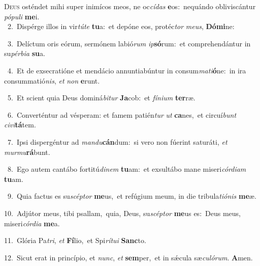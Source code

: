 \lettrine{\initial\textcolor{\initialcolor}{D}}{eus} osténdet mihi super inimícos meos, ne oc\-\textit{cí}\-\textit{das} \textbf{e}\-os:~\star nequándo obliviscántur \textit{pó}\-\textit{pu}\textit{li} \textbf{me}\-i.\\
{\numbfont\textcolor{\numbcolor}{~2.}}~Dispérge illos in vir\-\textit{tú}\-\textit{te} \textbf{tu}\-a:~\star et depóne eos, protéc\textit{tor} \textit{me}\-\textit{us}, \textbf{Dó}\-\textbf{mi}ne:\par
{\numbfont\textcolor{\numbcolor}{~3.}}~Delíctum oris eórum, sermónem labió\textit{rum} \textit{ip}\-\textbf{só}rum:~\star et comprehendántur in su\-\textit{pér}\-\textit{bi}\textit{a} \textbf{su}\-a.\par
{\numbfont\textcolor{\numbcolor}{~4.}}~Et de exsecratióne et mendácio annuntiabúntur in consum\-\textit{ma}\-\textit{ti}\textbf{ó}ne:~\star in ira consummatió\-\textit{nis}\-, \textit{et} \textit{non} \textbf{e}\-runt.\par
{\numbfont\textcolor{\numbcolor}{~5.}}~Et scient quia Deus dominá\-\textit{bi}\-\textit{tur} \textbf{Ja}\-cob:~\star et \textit{fí}\-\textit{ni}\textit{um} \textbf{ter}\-ræ.\par
{\numbfont\textcolor{\numbcolor}{~6.}}~Converténtur ad vésperam: et famem patién\textit{tur} \textit{ut} \textbf{ca}\-nes,~\star et circuí\textit{bunt} \textit{ci}\-\textit{vi}\textbf{tá}tem.\par
{\numbfont\textcolor{\numbcolor}{~7.}}~Ipsi dispergéntur ad \textit{man}\-\textit{du}\textbf{cán}dum:~\star si vero non fúerint saturáti, \textit{et} \textit{mur}\-\textit{mu}\textbf{rá}bunt.\par
{\numbfont\textcolor{\numbcolor}{~8.}}~Ego autem cantábo fortitú\-\textit{di}\-\textit{nem} \textbf{tu}\-am:~\star et exsultábo mane miseri\-\textit{cór}\-\textit{di}\textit{am} \textbf{tu}\-am.\par
{\numbfont\textcolor{\numbcolor}{~9.}}~Quia factus es su\-\textit{scép}\-\textit{tor} \textbf{me}\-us,~\star et refúgium meum, in die tribula\-\textit{ti}\-\textit{ó}\textit{nis} \textbf{me}\-æ.\par
{\numbfont\textcolor{\numbcolor}{10.}}~Adjútor meus, tibi psallam,~\dagger quia, Deus, su\-\textit{scép}\-\textit{tor} \textbf{me}\-us es:~\star Deus meus, miseri\-\textit{cór}\-\textit{di}\textit{a} \textbf{me}\-a.\par
{\numbfont\textcolor{\numbcolor}{11.}}~Glória Pa\-\textit{tri}\-, \textit{et} \textbf{Fí}\-lio,~\star et Spi\-\textit{rí}\-\textit{tu}\textit{i} \textbf{Sanc}\-to.\par
{\numbfont\textcolor{\numbcolor}{12.}}~Sicut erat in princípio, et \textit{nunc}\-, \textit{et} \textbf{sem}\-per,~\star et in sǽcula sæ\-\textit{cu}\-\textit{ló}\textit{rum}. \textbf{A}\-men.\par
